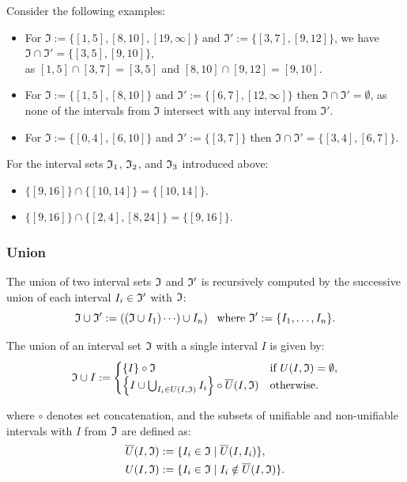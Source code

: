     \begin{example}Consider the following examples:
    \begin{itemize}
        \item For $\mathfrak{I}:= \{ [1, 5], [8, 10], [19,\infty] \}$ and $\mathfrak{I}':= \{ [3, 7], [9, 12] \}$, we have $\mathfrak{I}\cap \mathfrak{I}' = \{ [3, 5], [9, 10] \}$,\\ as $[1, 5] \cap [3, 7] = [3, 5]$ and $[8, 10] \cap [9, 12] = [9, 10]$.
        \item For $\mathfrak{I} := \{ [1, 5], [8, 10] \}$ and $\mathfrak{I}':= \{ [6, 7], [12, \infty] \}$ then $\mathfrak{I}\cap \mathfrak{I}' = \emptyset$, as none of the intervals from $\mathfrak{I}$ intersect with any interval from $\mathfrak{I}'$.
        \item For $\mathfrak{I} := \{ [0, 4], [6, 10] \}$ and $\mathfrak{I}':= \{ [3, 7] \}$ then $\mathfrak{I}\cap \mathfrak{I}' = \{[3,4],[6,7]\}$.
    \end{itemize}

    For the interval sets $\mathfrak{I}_1$, $\mathfrak{I}_2$, and $\mathfrak{I}_3$ introduced above:
    \begin{itemize}
        \item $\{[9,16]\} \cap \{[10,14]\}= \{[10,14]\}$.
        \item $\{[9,16]\} \cap \{[2,4],[8, 24]\}= \{[9,16]\}$.
    \end{itemize}
\end{example}


 \subsubsection{Union}
The union of two interval sets $\mathfrak{I}$ and $\mathfrak{I}'$ is recursively computed by the successive union of each interval $I_i \in \mathfrak{I}'$ with $\mathfrak{I}$:
\[
\mathfrak{I} \cup \mathfrak{I}' :=  \left( \left(\mathfrak{I} \cup I_1) \cdots \right) \cup I_n \right) \ \text{ where } \mathfrak{I}':= \{I_1, \dots, I_n \} .
\]


The union of an interval set $\mathfrak{I}$ with a single interval $I$ is given by:
\[
\mathfrak{I} \cup I :=
\begin{cases}
\{I\} \circ \mathfrak{I} & \text{if } U(I,\mathfrak{I})=\emptyset,\\
\left\{ I \cup \bigcup_{I_i \in U(I,\mathfrak{I})} I_i \right\} \circ \overline{U}(I,\mathfrak{I}) & \text{otherwise.}
\end{cases}
\]

where $\circ$ denotes set concatenation, and the subsets of unifiable and non-unifiable intervals with $I$ from $\mathfrak{I}$ are defined as:
\begin{align*}
\overline{U}(I, \mathfrak{I}) &:= \{ I_i \in \mathfrak{I} \mid \overline{U}(I, I_i) \}, \\
U(I, \mathfrak{I}) &:= \{ I_i \in \mathfrak{I} \mid I_i \notin \overline{U}(I, \mathfrak{I}) \}.
\end{align*}

